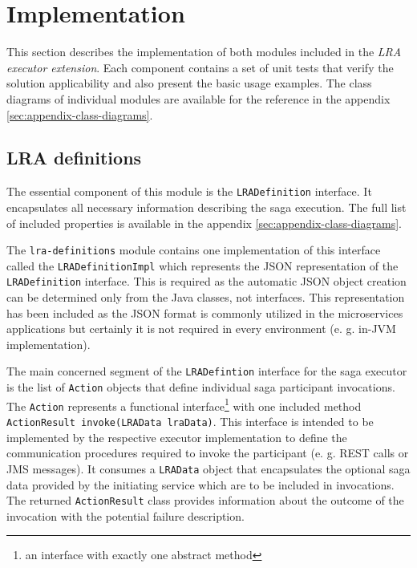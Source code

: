 \documentclass[oneside,
  digital, %
  table,   %
  lof,     %
  lot,     %
]{fithesis3}
\begin{document}
\section{Implementation}

This section describes the implementation of both modules included in the \textit{LRA executor extension}. Each component contains a set of unit tests that verify the solution applicability and also present the basic usage examples. The class diagrams of individual modules are available for the reference in the appendix \ref{sec:appendix-class-diagrams}.

\subsection{LRA definitions}

The essential component of this module is the \texttt{LRADefinition} interface. It encapsulates all necessary information describing the saga execution. The full list of included properties is available in the appendix \ref{sec:appendix-class-diagrams}. 

The \texttt{lra-definitions} module contains one implementation of this interface called the \texttt{LRADefinitionImpl} which represents the JSON representation of the \texttt{LRADefinition} interface. This is required as the automatic JSON object creation can be determined only from the Java classes, not interfaces. This representation has been included as the JSON format is commonly utilized in the microservices applications but certainly it is not required in every environment (e. g. in-JVM implementation).

The main concerned segment of the \texttt{LRADefintion} interface for the saga executor is the list of \texttt{Action} objects that define individual saga participant invocations. The \texttt{Action} represents a functional interface\footnote{an interface with exactly one abstract method} with one included method \texttt{ActionResult invoke(LRAData lraData)}. This interface is intended to be implemented by the respective executor implementation to define the communication procedures required to invoke the participant (e. g. REST calls or JMS messages). It consumes a \texttt{LRAData} object that encapsulates the optional saga data provided by the initiating service which are to be included in invocations. The returned \texttt{ActionResult} class provides information about the outcome of the invocation with the potential failure description.
\end{document}
